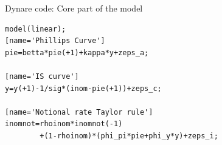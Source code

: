 %
\begin{frame}[fragile]{Dynare code: Core part of the model}
\begin{verbatim}
model(linear);
[name='Phillips Curve']
pie=betta*pie(+1)+kappa*y+zeps_a;

[name='IS curve']
y=y(+1)-1/sig*(inom-pie(+1))+zeps_c;

[name='Notional rate Taylor rule']
inomnot=rhoinom*inomnot(-1)
        +(1-rhoinom)*(phi_pi*pie+phi_y*y)+zeps_i;
\end{verbatim}
\end{frame}


